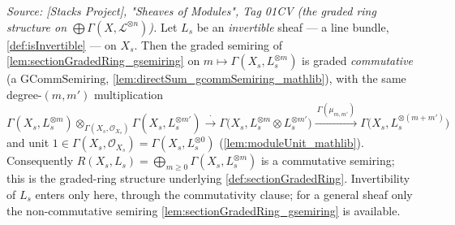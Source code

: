 \begin{lemma}
  \label{lem:sectionGradedRing_gcommSemiring}
  \textit{Source: [Stacks Project], "Sheaves of Modules", Tag 01CV (the graded
  ring structure on \(\bigoplus \Gamma(X,\mathcal{L}^{\otimes n})\)).}
  Let \(L_s\) be an \emph{invertible} sheaf --- a line bundle,
  \cref{def:isInvertible} --- on \(X_s\). Then the graded semiring of
  \cref{lem:sectionGradedRing_gsemiring} on
  \(m \mapsto \Gamma(X_s, L_s^{\otimes m})\) is graded \emph{commutative} (a
  \(\mathrm{GCommSemiring}\), \cref{lem:directSum_gcommSemiring_mathlib}), with the
  same degree-\((m,m')\) multiplication
  \[
    \Gamma(X_s, L_s^{\otimes m}) \otimes_{\Gamma(X_s,\mathcal{O}_{X_s})}
      \Gamma(X_s, L_s^{\otimes m'})
    \xrightarrow{\ \cdot\ }
    \Gamma\bigl(X_s, L_s^{\otimes m} \otimes L_s^{\otimes m'}\bigr)
    \xrightarrow{\ \Gamma(\mu_{m,m'})\ }
    \Gamma\bigl(X_s, L_s^{\otimes (m+m')}\bigr)
  \]
  and unit \(1 \in \Gamma(X_s, \mathcal{O}_{X_s}) = \Gamma(X_s, L_s^{\otimes 0})\)
  (\cref{lem:moduleUnit_mathlib}). Consequently
  \(R(X_s, L_s) = \bigoplus_{m \ge 0} \Gamma(X_s, L_s^{\otimes m})\) is a
  commutative semiring; this is the graded-ring structure underlying
  \cref{def:sectionGradedRing}. Invertibility of \(L_s\) enters only here, through
  the commutativity clause; for a general sheaf only the non-commutative semiring
  \cref{lem:sectionGradedRing_gsemiring} is available.
\end{lemma}

